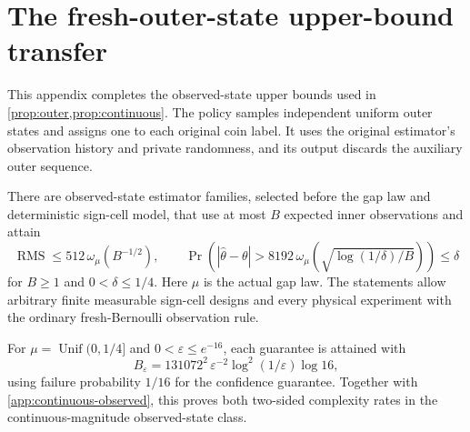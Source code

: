 \section{The fresh-outer-state upper-bound transfer}
\label{app:observed-upper}

This appendix completes the observed-state upper bounds used in
\cref{prop:outer,prop:continuous}. The policy samples independent
uniform outer states and assigns one to each original coin label.
It uses the original estimator's observation history and private
randomness, and its output discards the auxiliary outer sequence.

\begin{theorem}
\label{thm:observed-upper-verified}
There are observed-state estimator families, selected before the gap
law and deterministic sign-cell model, that use at most $B$ expected
inner observations and attain
\[
 \operatorname{RMS}\le512\,\omega_\mu(B^{-1/2}),
 \qquad
 \Pr\!\left(
 |\widehat\theta-\theta|>
 8192\,\omega_\mu\!\left(\sqrt{\log(1/\delta)/B}\right)
 \right)\le\delta
\]
for $B\ge1$ and $0<\delta\le1/4$.
Here $\mu$ is the actual gap law. The statements allow arbitrary
finite measurable sign-cell designs and every physical experiment
with the ordinary fresh-Bernoulli observation rule.

For $\mu=\operatorname{Unif}(0,1/4]$ and
$0<\varepsilon\le e^{-16}$, each guarantee is attained with
\[
 B_\varepsilon
 =131072^2\,\varepsilon^{-2}\log^2(1/\varepsilon)\log16,
\]
using failure probability $1/16$ for the confidence guarantee.
Together with \cref{app:continuous-observed}, this proves both
two-sided complexity rates in the continuous-magnitude observed-state
class.
\end{theorem}


